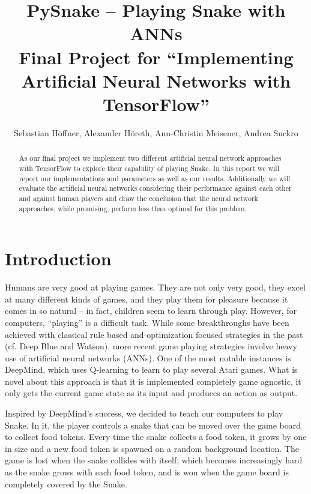 \documentclass[a4paper]{article}
\title{PySnake -- Playing Snake with ANNs\\\normalsize{Final Project for ``Implementing Artificial Neural Networks with TensorFlow''}}
\author{Sebastian Höffner, Alexander Höreth, Ann-Christin Meisener, Andrea Suckro}
\begin{document}
\onehalfspacing
\maketitle

\begin{abstract}
As our final project we implement two different artificial neural network approaches with TensorFlow to explore their capability of playing Snake. In this report we will report our implementations and parameters as well as our results. Additionally we will evaluate the artificial neural networks considering their performance against each other and against human players and draw the conclusion that the neural network approaches, while promising,  perform less than optimal for this problem.
\end{abstract}


\section{Introduction}
Humans are very good at playing games. They are not only very good, they excel at many different kinds of games, and they play them for pleasure because it comes in so natural -- in fact, children seem to learn through
play\cite{wiki:ltp}. However, for computers, ``playing'' is a difficult task. While some breakthroughs have been achieved with classical rule based and optimization focused strategies in the past (cf. Deep Blue\cite{CAMPBELL200257} and Watson\cite{FERRUCCI201393}), more recent game playing strategies involve heavy use of artificial neural networks (ANNs). One of the most notable instances is DeepMind, which uses Q-learning to learn to play several Atari games\cite{mnih2013}. What is novel about this approach is that it is implemented completely game agnostic, it only gets the current game state as its input and produces an action as output.

Inspired by DeepMind's success, we decided to teach our computers to play
Snake. In it, the player controls a snake that can be moved over the game board to collect food tokens. Every time the snake collects a food token, it grows by one in size and a new food token is spawned on a random background location. The game is lost when the snake collides with itself, which becomes increasingly hard as the snake grows with each food token, and is won when the game board is completely
covered by the Snake. 
\end{document}
